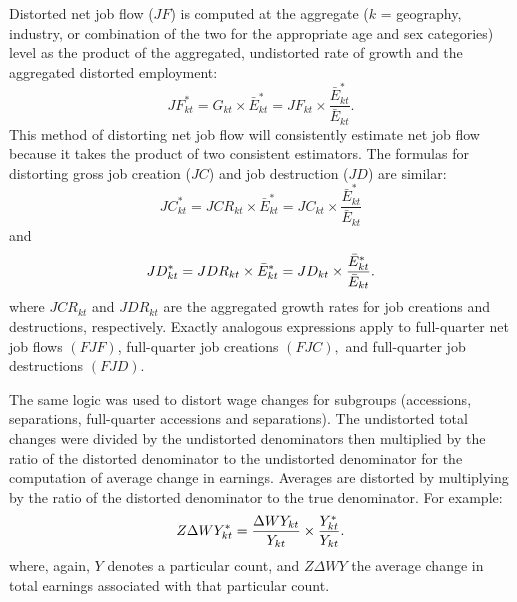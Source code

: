 
Distorted net job flow%
 ($JF$) is computed at the aggregate ($k$ = geography,
industry, or combination of the two for the appropriate age and sex
categories) level as the product of the aggregated, undistorted rate of growth
and the aggregated distorted employment:%
\[
JF_{kt}^{\ast }=G_{kt}\times 
\bar{E}_{kt}^{\ast }=JF_{kt}\times \frac{\bar{E}_{kt}^{\ast }}{\bar{E}_{kt}}.
\]%
This method of distorting net job flow will consistently estimate net job flow
because it takes the product of two consistent estimators. The formulas for
distorting gross job creation ($JC$) and job destruction ($JD$) are similar: 
%
\[
JC_{kt}^{\ast }=JCR_{kt}\times 
\bar{E}_{kt}^{\ast }=JC_{kt}\times \frac{\bar{E}_{kt}^{\ast }}{\bar{E}_{kt}}
\]%
and%
\[
JD_{kt}^{\ast }=JDR_{kt}\times \bar{E}_{kt}^{\ast }=JD_{kt}\times \frac{\bar{%
E}_{kt}^{\ast }}{\bar{E}_{kt}}.
\]%
where $JCR_{kt}$ and $JDR_{kt}$ are the aggregated growth rates for job
creations and destructions, respectively. Exactly analogous expressions
apply to full-quarter net job flows $\left( FJF\right) $, full-quarter job
creations $\left( FJC\right) ,$ and full-quarter job destructions $\left(
FJD\right) .$

The same logic was used to distort wage changes for subgroups (accessions,
separations, full-quarter accessions and separations). 
The undistorted total changes were divided by the undistorted denominators then
multiplied by the ratio of the distorted denominator to the undistorted
denominator for the computation of average change in earnings. 
Averages are distorted by multiplying by the ratio of the distorted denominator to
the true denominator. For example:%
\[
Z\Delta WY_{kt}^{\ast }=\frac{\Delta WY_{kt}}{Y_{kt}}\times \frac{%
Y_{kt}^{\ast }}{Y_{kt}}.
\]%
where, again, $Y$ denotes a particular count, and $Z\Delta WY$ the average
change in total earnings associated with that particular count.

